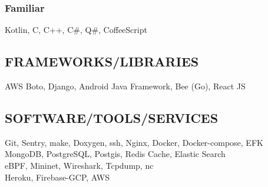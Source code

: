 \documentclass[letterpaper]{deedy-resume} %
\begin{document}
\begin{minipage}[t]{0.33\textwidth}
\subsubsection*{Familiar}
\squeezeup
Kotlin, C, C++, C\#, Q\#, CoffeeScript

\sectionspace %

\subsection{FRAMEWORKS/LIBRARIES}
AWS Boto, Django, Android Java Framework, Bee (Go), React JS

\sectionspace %

\subsection{SOFTWARE/TOOLS/SERVICES}
Git, Sentry, make, Doxygen, ssh, Nginx, Docker, Docker-compose, EFK \\
MongoDB, PostgreSQL, Postgis, Redis Cache, Elastic Search \\
eBPF, Mininet, Wireshark, Tcpdump, nc \\
Heroku, Firebase-GCP, AWS \\


\sectionspace %





\end{minipage}
\end{document}
